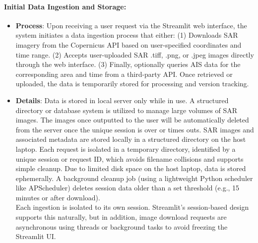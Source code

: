 \documentclass{article}
\begin{document}
\paragraph{Initial Data Ingestion and Storage:}
\begin{itemize}
	\item \textbf{Process}: Upon receiving a user request via the Streamlit web interface, the system initiates a data ingestion process that either: (1) Downloads SAR imagery from the Copernicus API based on user-specified coordinates and time range. (2) Accepts user-uploaded SAR .tiff, .png, or .jpeg images directly through the web interface. (3) Finally, optionally queries AIS data for the corresponding area and time from a third-party API. Once retrieved or uploaded, the data is temporarily stored for processing and version tracking.
\item \textbf{Details}: Data is stored in local server only while in use. A structured directory or database system is utilized to manage large volumes of SAR images. The images once outputted to the user will be automatically deleted from the server once the unique session is over or times outs. SAR images and associated metadata are stored locally in a structured directory on the host laptop. Each request is isolated in a temporary directory, identified by a unique session or request ID, which avoids filename collisions and supports simple cleanup. Due to limited disk space on the host laptop, data is stored ephemerally. A background cleanup job (using a lightweight Python scheduler like APScheduler) deletes session data older than a set threshold (e.g., 15 minutes or after download).\\

Each ingestion is isolated to its own session. Streamlit’s session-based design supports this naturally, but in addition, image download requests are asynchronous using threads or background tasks to avoid freezing the Streamlit UI.
\end{itemize}
\end{document}
